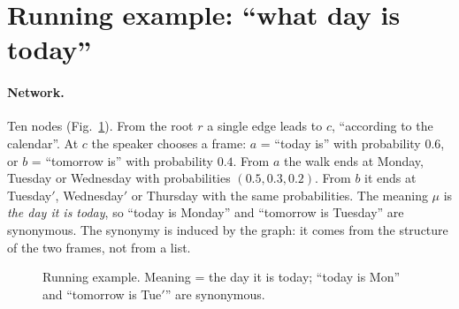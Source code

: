 \documentclass[11pt]{article}
\theoremstyle{remark}
\begin{document}
\section{Running example: ``what day is today''}\label{sec:example}

\paragraph{Network.} Ten nodes (Fig.~\ref{fig:week}). From the root $r$ a single edge leads to $c$, ``according to the calendar''. At $c$ the speaker chooses a frame: $a$ = ``today is'' with probability $0.6$, or $b$ = ``tomorrow is'' with probability $0.4$. From $a$ the walk ends at Monday, Tuesday or Wednesday with probabilities $(0.5,0.3,0.2)$. From $b$ it ends at Tuesday$'$, Wednesday$'$ or Thursday with the same probabilities. The meaning $\mu$ is \emph{the day it is today}, so ``today is Monday'' and ``tomorrow is Tuesday'' are synonymous. The synonymy is induced by the graph: it comes from the structure of the two frames, not from a list.

\begin{figure}[h]
\centering
{}
\caption{Running example. Meaning = the day it is today; ``today is Mon'' and ``tomorrow is Tue$'$'' are synonymous.}
\label{fig:week}
\end{figure}
\end{document}
